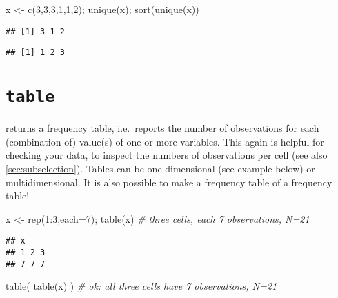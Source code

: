 \documentclass[
]{book}
\newenvironment{Shaded}{\begin{snugshade}}{\end{snugshade}}
\newcommand{\AttributeTok}[1]{\textcolor[rgb]{0.77,0.63,0.00}{#1}}
\newcommand{\CommentTok}[1]{\textcolor[rgb]{0.56,0.35,0.01}{\textit{#1}}}
\newcommand{\DecValTok}[1]{\textcolor[rgb]{0.00,0.00,0.81}{#1}}
\newcommand{\FunctionTok}[1]{\textcolor[rgb]{0.00,0.00,0.00}{#1}}
\newcommand{\NormalTok}[1]{#1}
\newcommand{\OtherTok}[1]{\textcolor[rgb]{0.56,0.35,0.01}{#1}}
\newcommand{\SpecialCharTok}[1]{\textcolor[rgb]{0.00,0.00,0.00}{#1}}
\begin{document}
\begin{Shaded}
\begin{Highlighting}[]
\NormalTok{x }\OtherTok{\textless{}{-}} \FunctionTok{c}\NormalTok{(}\DecValTok{3}\NormalTok{,}\DecValTok{3}\NormalTok{,}\DecValTok{3}\NormalTok{,}\DecValTok{1}\NormalTok{,}\DecValTok{1}\NormalTok{,}\DecValTok{2}\NormalTok{); }\FunctionTok{unique}\NormalTok{(x); }\FunctionTok{sort}\NormalTok{(}\FunctionTok{unique}\NormalTok{(x))}
\end{Highlighting}
\end{Shaded}

\begin{verbatim}
## [1] 3 1 2
\end{verbatim}

\begin{verbatim}
## [1] 1 2 3
\end{verbatim}

\hypertarget{table}{%
\section{\texorpdfstring{\texttt{table}}{table}}\label{table}}

returns a frequency table, i.e.~reports the number of observations
for each (combination of) value(s) of one or more variables. This
again is helpful for checking your data, to inspect the numbers of
observations per cell (see also \ref{sec:subselection}).
Tables can be one-dimensional (see
example below) or multidimensional. It is also possible to make a
frequency table of a frequency table!

\begin{Shaded}
\begin{Highlighting}[]
\NormalTok{x }\OtherTok{\textless{}{-}} \FunctionTok{rep}\NormalTok{(}\DecValTok{1}\SpecialCharTok{:}\DecValTok{3}\NormalTok{,}\AttributeTok{each=}\DecValTok{7}\NormalTok{); }\FunctionTok{table}\NormalTok{(x) }\CommentTok{\# three cells, each 7 observations, N=21}
\end{Highlighting}
\end{Shaded}

\begin{verbatim}
## x
## 1 2 3 
## 7 7 7
\end{verbatim}

\begin{Shaded}
\begin{Highlighting}[]
\FunctionTok{table}\NormalTok{( }\FunctionTok{table}\NormalTok{(x) ) }\CommentTok{\# ok: all three cells have 7 observations, N=21}
\end{Highlighting}
\end{Shaded}
\end{document}
